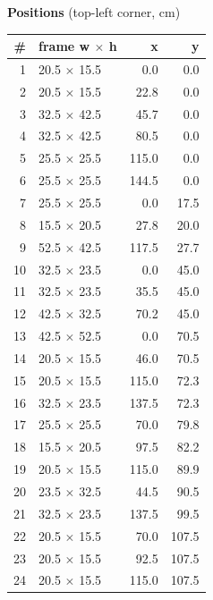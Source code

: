 \documentclass[a4paper,landscape,10pt]{article}
\begin{document}
\begin{minipage}[t]{0.25\textwidth}
\vspace{8pt}
{\bfseries Positions} (top-left corner, cm)\\[2pt]
\tiny
\begin{tabular}{@{}r l r r@{}}
\toprule
\# & frame w $\times$ h & x & y \\
\midrule
1 & 20.5 $\times$ 15.5 & 0.0 & 0.0 \\
2 & 20.5 $\times$ 15.5 & 22.8 & 0.0 \\
3 & 32.5 $\times$ 42.5 & 45.7 & 0.0 \\
4 & 32.5 $\times$ 42.5 & 80.5 & 0.0 \\
5 & 25.5 $\times$ 25.5 & 115.0 & 0.0 \\
6 & 25.5 $\times$ 25.5 & 144.5 & 0.0 \\
7 & 25.5 $\times$ 25.5 & 0.0 & 17.5 \\
8 & 15.5 $\times$ 20.5 & 27.8 & 20.0 \\
9 & 52.5 $\times$ 42.5 & 117.5 & 27.7 \\
10 & 32.5 $\times$ 23.5 & 0.0 & 45.0 \\
11 & 32.5 $\times$ 23.5 & 35.5 & 45.0 \\
12 & 42.5 $\times$ 32.5 & 70.2 & 45.0 \\
13 & 42.5 $\times$ 52.5 & 0.0 & 70.5 \\
14 & 20.5 $\times$ 15.5 & 46.0 & 70.5 \\
15 & 20.5 $\times$ 15.5 & 115.0 & 72.3 \\
16 & 32.5 $\times$ 23.5 & 137.5 & 72.3 \\
17 & 25.5 $\times$ 25.5 & 70.0 & 79.8 \\
18 & 15.5 $\times$ 20.5 & 97.5 & 82.2 \\
19 & 20.5 $\times$ 15.5 & 115.0 & 89.9 \\
20 & 23.5 $\times$ 32.5 & 44.5 & 90.5 \\
21 & 32.5 $\times$ 23.5 & 137.5 & 99.5 \\
22 & 20.5 $\times$ 15.5 & 70.0 & 107.5 \\
23 & 20.5 $\times$ 15.5 & 92.5 & 107.5 \\
24 & 20.5 $\times$ 15.5 & 115.0 & 107.5 \\
\bottomrule
\end{tabular}
\end{minipage}
\clearpage
\end{document}
